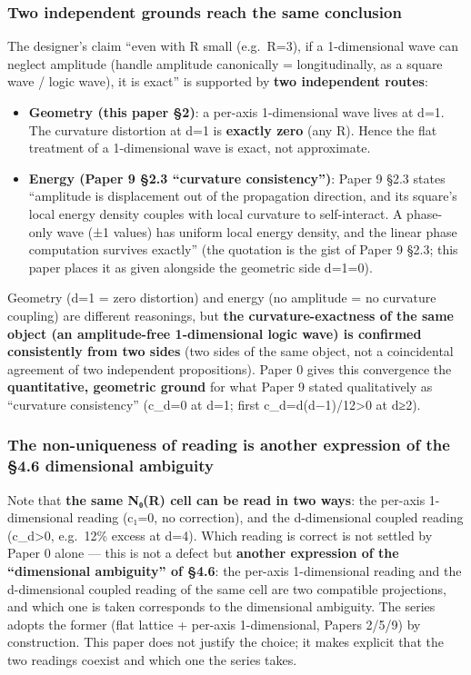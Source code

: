 \documentclass[
]{ltjsarticle}
\providecommand{\tightlist}{%
  \setlength{\itemsep}{0pt}\setlength{\parskip}{0pt}}
\begin{document}
\subsubsection{Two independent grounds reach the same
conclusion}\label{two-independent-grounds-reach-the-same-conclusion}

The designer's claim ``even with R small (e.g.~R=3), if a 1-dimensional
wave can neglect amplitude (handle amplitude canonically =
longitudinally, as a square wave / logic wave), it is exact'' is
supported by \textbf{two independent routes}:

\begin{itemize}
\tightlist
\item
  \textbf{Geometry (this paper §2)}: a per-axis 1-dimensional wave lives
  at d=1. The curvature distortion at d=1 is \textbf{exactly zero} (any
  R). Hence the flat treatment of a 1-dimensional wave is exact, not
  approximate.
\item
  \textbf{Energy (Paper 9 §2.3 ``curvature consistency'')}: Paper 9 §2.3
  states ``amplitude is displacement out of the propagation direction,
  and its square's local energy density couples with local curvature to
  self-interact. A phase-only wave (±1 values) has uniform local energy
  density, and the linear phase computation survives exactly'' (the
  quotation is the gist of Paper 9 §2.3; this paper places it as given
  alongside the geometric side d=1=0).
\end{itemize}

Geometry (d=1 = zero distortion) and energy (no amplitude = no curvature
coupling) are different reasonings, but \textbf{the curvature-exactness
of the same object (an amplitude-free 1-dimensional logic wave) is
confirmed consistently from two sides} (two sides of the same object,
not a coincidental agreement of two independent propositions). Paper 0
gives this convergence the \textbf{quantitative, geometric ground} for
what Paper 9 stated qualitatively as ``curvature consistency'' (c\_d=0
at d=1; first c\_d=d(d−1)/12\textgreater0 at d≥2).

\subsubsection{The non-uniqueness of reading is another expression of
the §4.6 dimensional
ambiguity}\label{the-non-uniqueness-of-reading-is-another-expression-of-the-4.6-dimensional-ambiguity}

Note that \textbf{the same N₀(R) cell can be read in two ways}: the
per-axis 1-dimensional reading (c₁=0, no correction), and the
d-dimensional coupled reading (c\_d\textgreater0, e.g.~12\% excess at
d=4). Which reading is correct is not settled by Paper 0 alone --- this
is not a defect but \textbf{another expression of the ``dimensional
ambiguity'' of §4.6}: the per-axis 1-dimensional reading and the
d-dimensional coupled reading of the same cell are two compatible
projections, and which one is taken corresponds to the dimensional
ambiguity. The series adopts the former (flat lattice + per-axis
1-dimensional, Papers 2/5/9) by construction. This paper does not
justify the choice; it makes explicit that the two readings coexist and
which one the series takes.
\end{document}
